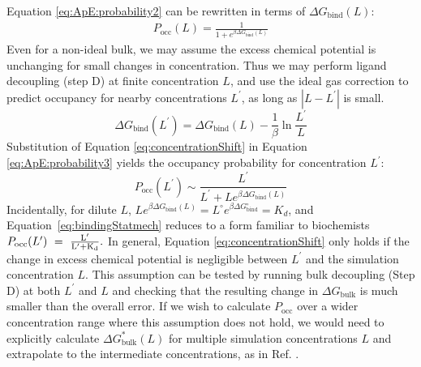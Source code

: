 \documentclass[9pt,tutorial]{Styling/livecoms}
\begin{document}
Equation \ref{eq:ApE:probability2} can be rewritten in terms of $\Delta G_\mathrm{bind}(L)$:  
\begin{align}
 P_\mathrm{occ}(L) = \frac{1}{1+e^{\beta \Delta G_\mathrm{bind}(L)}} \label{eq:ApE:probability3}
\end{align}
Even for a non-ideal bulk, we may assume the excess chemical potential is unchanging for small changes in concentration. Thus we may perform ligand decoupling (step D) at finite concentration $L$, and use the ideal gas correction to predict occupancy for nearby concentrations $L^\prime$, as long as $|L-L^\prime|$ is small.
\begin{equation}
\label{eq:concentrationShift}
    \Delta G_\mathrm{bind}(L^\prime)= \Delta G_\mathrm{bind}(L)-\frac{1}{\beta} \ln \frac{L^\prime}{L}
\end{equation}
Substitution of Equation \ref{eq:concentrationShift} in Equation \ref{eq:ApE:probability3} yields the occupancy probability for concentration $L^\prime$:
\begin{equation}\label{eq:bindingStatmech}
    P_\mathrm{occ}(L^\prime)\sim\frac{L^\prime}{L^\prime+{L}e^{\beta \Delta G_\mathrm{bind}(L)}}
    \end{equation} 
Incidentally, for dilute $L$, ${L}e^{\beta \Delta G_\mathrm{bind}(L)}={L^\circ}e^{\beta \Delta G^\circ_\mathrm{bind}}=K_d$,
and Equation~\ref{eq:bindingStatmech} reduces to  a form familiar to biochemists 
$
    P_\mathrm{occ}(L^\prime)~=~\rm\frac{L^\prime}{L^\prime+K_d}.
$
In general, Equation \ref{eq:concentrationShift} only holds if the change in excess chemical potential is negligible between $L^\prime$ and the simulation concentration $L$.
This assumption can be tested by running bulk decoupling (Step D) at both $L^\prime$ and $L$ and checking that the resulting change in $\Delta G_\mathrm{bulk}$ is much smaller than the overall error. If we wish to calculate $P_\mathrm{occ}$ over a wider concentration range where this assumption does not hold, we would need to explicitly calculate $\Delta G^*_\mathrm{bulk}(L)$ for multiple simulation concentrations $L$ and extrapolate to the intermediate concentrations, as in Ref. \cite{Salari2018}.

\onecolumn
\end{document}
